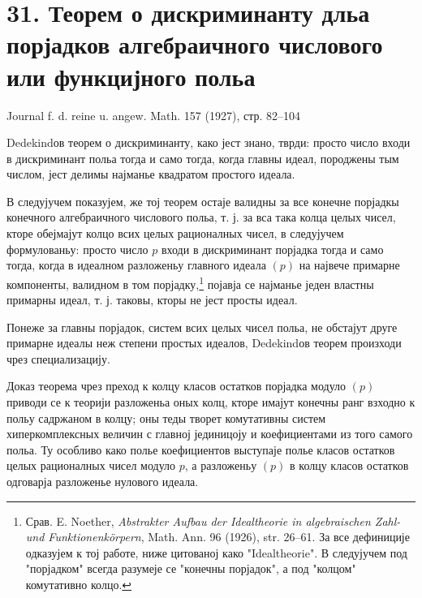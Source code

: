 \documentclass[11pt]{article}
\begin{document}

\section*{31. Теорем о дискриминанту дльа порјадков алгебраичного числового или функцијного польа}
\begin{center}
Journal f. d. reine u. angew. Math. 157 (1927), стр. 82--104
\end{center}

Dedekindов теорем о дискриминанту, како јест знано, тврди: просто число входи в дискриминант польа тогда и само тогда, когда главны идеал, породжены тым числом, јест делимы најманье квадратом простого идеала.

В следујучем показујем, же тој теорем остаје валидны за все конечне порјадкы конечного алгебраичного числового польа, т. ј. за вса така колца целых чисел, кторе обејмајут колцо всих целых рационалных чисел, в следујучем формулованьу: просто число $p$ входи в дискриминант порјадка тогда и само тогда, когда в идеалном разложеньу главного идеала $(p)$ на највече примарне компоненты, валидном в том порјадку,\footnote{Срав. E. Noether, \emph{Abstrakter Aufbau der Idealtheorie in algebraischen Zahl- und Funktionenkörpern}, Math. Ann. 96 (1926), str. 26--61. За все дефиниције одказујем к тој работе, ниже цитованој како "Idealtheorie". В следујучем под "порјадком" всегда разумеје се "конечны порјадок", а под "колцом" комутативно колцо.} појавја се најманье једен властны примарны идеал, т. ј. таковы, кторы не јест просты идеал.

Понеже за главны порјадок, систем всих целых чисел польа, не обстајут друге примарне идеалы неж степени простых идеалов, Dedekindов теорем произходи чрез специализацију.

Доказ теорема чрез преход к колцу класов остатков порјадка модуло $(p)$ приводи се к теорији разложеньа оных колц, кторе имајут конечны ранг взходно к польу садржаном в колцу; оны теды творет комутативны систем хиперкомплексных величин с главној јединицоју и коефициентами из того самого польа. Ту особливо како полье коефициентов выступаје полье класов остатков целых рационалных чисел модуло $p$, а разложеньу $(p)$ в колцу класов остатков одговарја разложенье нулового идеала.
\end{document}
